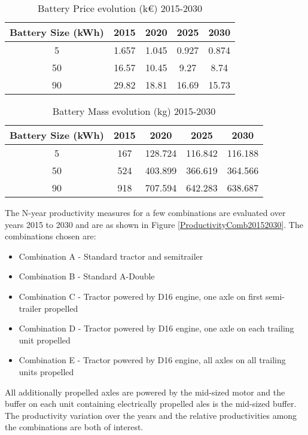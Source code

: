 \documentclass[ExampleMasters.tex]{subfiles}
\begin{document}
	\begin{table}[ht]
		\centering 
		\begin{tabular}{c c c c c}
			\hline
			Battery Size (kWh) & 2015 & 2020 & 2025 & 2030\\ 
			\hline
			5 & 1.657 & 1.045 & 0.927 & 0.874\\
			50 & 16.57 & 10.45 & 9.27 & 8.74\\
			90 & 29.82 & 18.81 & 16.69 & 15.73\\
			\hline 
		\end{tabular}
		\caption{Battery Price evolution (k\euro) 2015-2030 \cite{ElementEnergy}} 
		\label{table:ParameterSensitivityBattery} 
	\end{table}

	\begin{table}[ht]
		\centering 
		\begin{tabular}{c c c c c}
			\hline
			Battery Size (kWh) & 2015 & 2020 & 2025 & 2030\\ 
			\hline
			5 & 167 & 128.724 & 116.842 & 116.188\\
			50 & 524 & 403.899 & 366.619 & 364.566\\
			90 & 918 & 707.594 & 642.283 & 638.687\\
			\hline 
		\end{tabular}
		\caption{Battery Mass evolution (kg) 2015-2030 \cite{ElementEnergy}} 
		\label{table:ParameterSensitivityBatteryMass} 
	\end{table}

	The N-year productivity measures for a few combinations are evaluated over years 2015 to 2030 and are as shown in Figure \ref{ProductivityComb20152030}. The combinations chosen are:

	\begin{itemize}
	\item Combination A - Standard tractor and semitrailer
	\item Combination B - Standard A-Double
	\item Combination C - Tractor powered by D16 engine, one axle on first semi-trailer propelled
	\item Combination D - Tractor powered by D16 engine, one axle on each trailing unit propelled
	\item Combination E - Tractor powered by D16 engine, all axles on all trailing units propelled
	\end{itemize}

	All additionally propelled axles are powered by the mid-sized motor and the buffer on each unit containing electrically propelled ales is the mid-sized buffer. The productivity variation over the years and the relative productivities among the combinations are both of interest.\\
\end{document}
